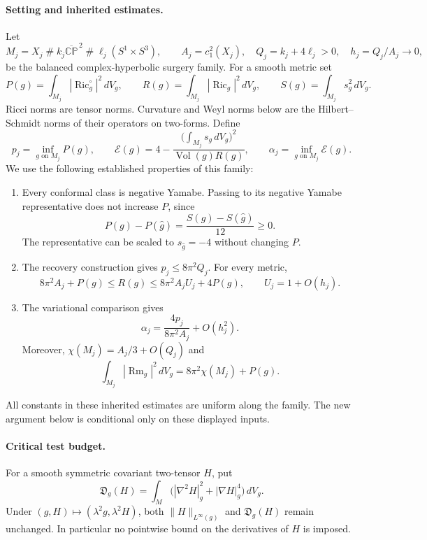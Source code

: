 \documentclass[11pt]{article}
\begin{document}
\paragraph{Setting and inherited estimates.}
Let
\[
 M_j=X_j\mathbin{\#}k_j\overline{\mathbb{CP}}^{\,2}
       \mathbin{\#}\ell_j(S^1\times S^3),
 \qquad A_j=c_1^2(X_j),\quad Q_j=k_j+4\ell_j>0,
 \quad h_j=Q_j/A_j\longrightarrow0,
\]
be the balanced complex-hyperbolic surgery family. For a smooth metric set
\[
 P(g)=\int_{M_j}|\operatorname{Ric}^{\circ}_g|^2\,dV_g,
 \qquad R(g)=\int_{M_j}|\operatorname{Ric}_g|^2\,dV_g,
 \qquad S(g)=\int_{M_j}s_g^2\,dV_g.
\]
Ricci norms are tensor norms. Curvature and Weyl norms below are the
Hilbert--Schmidt norms of their operators on two-forms. Define
\[
 p_j=\inf_{g\text{ on }M_j}P(g),\qquad
 \mathcal E(g)=4-
 \frac{\bigl(\int_{M_j}s_g\,dV_g\bigr)^2}
      {\operatorname{Vol}(g)R(g)},\qquad
 \alpha_j=\inf_{g\text{ on }M_j}\mathcal E(g).
\]
We use the following established properties of this family:
\begin{enumerate}
\item Every conformal class is negative Yamabe. Passing to its negative
Yamabe representative does not increase $P$, since
\[
 P(g)-P(\widehat g)=\frac{S(g)-S(\widehat g)}{12}\ge0.
\]
The representative can be scaled to $s_{\widehat g}=-4$ without changing
$P$.
\item The recovery construction gives $p_j\le8\pi^2Q_j$. For every metric,
\[
 8\pi^2A_j+P(g)\le R(g)
 \le8\pi^2A_jU_j+4P(g),\qquad U_j=1+O(h_j).
\]
\item The variational comparison gives
\[
 \alpha_j=\frac{4p_j}{8\pi^2A_j}+O(h_j^2).
\]
Moreover, $\chi(M_j)=A_j/3+O(Q_j)$ and
\[
 \int_{M_j}|\operatorname{Rm}_g|^2\,dV_g
       =8\pi^2\chi(M_j)+P(g).
\]
\end{enumerate}
All constants in these inherited estimates are uniform along the family.
The new argument below is conditional only on these displayed inputs.

\paragraph{Critical test budget.}
For a smooth symmetric covariant two-tensor $H$, put
\[
 \mathfrak D_g(H)=\int_M
      \bigl(|\nabla^2H|_g^2+|\nabla H|_g^4\bigr)\,dV_g.
\]
Under $(g,H)\mapsto(\lambda^2g,\lambda^2H)$, both
$\|H\|_{L^\infty(g)}$ and $\mathfrak D_g(H)$ remain unchanged.
In particular no pointwise bound on the derivatives of $H$ is imposed.
\end{document}
